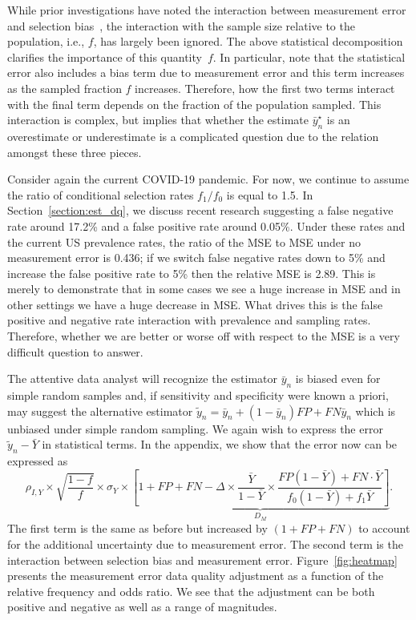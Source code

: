 \documentclass[aoas]{amsart}
\begin{document}
While prior investigations have noted the interaction between measurement error and selection bias~\citep{Beesley2020,Beesley2019,Smeden2019}, the interaction with the sample size relative to the population, i.e., $f$, has largely been ignored.  The above statistical decomposition clarifies the importance of this quantity~$f$.  In particular, note that the statistical error also includes a bias term due to measurement error and this term increases as the sampled fraction $f$ increases. Therefore, how the first two terms interact with the final term depends on the fraction of the population sampled.  This interaction is complex, but implies that whether the estimate $\bar y^\star_n$ is an overestimate or underestimate is a complicated question due to the relation amongst these three pieces.

Consider again the current COVID-19 pandemic. For now, we continue to assume the ratio of conditional selection rates $f_1/f_0$ is equal to 1.5.  In Section~\ref{section:est_dq}, we discuss recent research suggesting a false negative rate around 17.2\% and a false positive rate around 0.05\%. Under these rates and the current US prevalence rates, the ratio of the MSE to MSE under no measurement error is 0.436; if we switch false negative rates down to 5\% and increase the false positive rate to 5\% then the relative MSE is 2.89.  This is merely to demonstrate that in some cases we see a huge increase in MSE and in other settings we have a huge decrease in MSE.  What drives this is the false positive and negative rate interaction with prevalence and sampling rates.  Therefore, whether we are better or worse off with respect to the MSE is a very difficult question to answer.


The attentive data analyst will recognize the estimator $\bar y_n$ is biased even for simple random samples and, if sensitivity and specificity were known a priori, may suggest the alternative estimator $\tilde y_n = \bar y_n + (1-\bar y_n) FP + FN \bar y_n$ which is unbiased under simple random sampling. We again wish to express the error $\tilde  y_n - \bar Y$ in statistical terms. In the appendix, we show that the error now can be expressed as
\begin{equation}
\label{eq:error}
\rho_{I,Y} \times \sqrt{\frac{1-f}{f}} \times \sigma_{Y}
\times \underbrace{\left[ 1 + FP + FN - \Delta \times \frac{\bar Y}{1-\bar Y} \times \frac{FP(1-\bar Y) + FN \cdot \bar Y}{f_0 (1-\bar Y) + f_1 \bar Y} \right]}_{D_M}.
\end{equation}
The first term is the same as before but increased by $(1 + FP + FN)$ to account for the additional uncertainty due to measurement error.  The second term is the interaction between selection bias and measurement error.  Figure~\ref{fig:heatmap} presents the measurement error data quality adjustment as a function of the relative frequency and odds ratio.  We see that the adjustment can be both positive and negative as well as a range of magnitudes.
\end{document}
